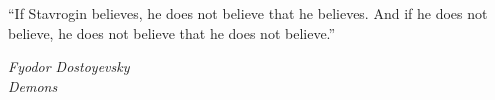 \epigraph{“If Stavrogin believes, he does not believe that he believes. And if he does not believe, he does not believe that he does not believe.” }{\textit{Fyodor Dostoyevsky \\ Demons }}